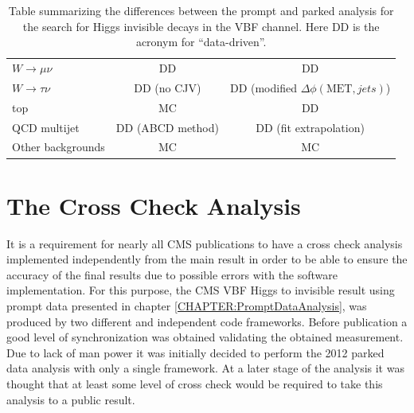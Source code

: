 \begin{table}[!htp]
\begin{tabular}{|l||c|c|}
$W\rightarrow\mu\nu$    & DD               & DD                                          \\
$W\rightarrow\tau\nu$   & DD (no CJV)      & DD (modified $\Delta\phi(\text{MET},jets)$) \\
top                     & MC               & DD                                          \\
QCD multijet            & DD (ABCD method) & DD (fit extrapolation)                      \\ 
Other backgrounds        & MC               & MC                                          \\ 
\hline
\end{tabular}
\caption[Table summarizing the differences between the prompt and parked analysis for the search for Higgs invisible decays in the VBF channel.]
{Table summarizing the differences between the prompt and parked analysis for the search for Higgs invisible decays in the VBF channel. Here DD is the acronym for ``data-driven''.}
\label{TABLE:ParkedDataAnalysis_DifferencesPromptParked}
\end{table}

\section{The Cross Check Analysis}
\label{CHAPTER:ParkedDataAnalysis_CrossCheckAnalysis}


It is a requirement for nearly all \gls{CMS} publications to have a cross check analysis implemented independently from the main result in order to be able to ensure the accuracy of the final results due to possible errors with the software implementation. For this purpose, the \gls{CMS} \gls{VBF} Higgs to invisible result using prompt data presented in chapter \ref{CHAPTER:PromptDataAnalysis}, was produced by two different and independent code frameworks. Before publication a good level of synchronization was obtained validating the obtained measurement. Due to lack of man power it was initially decided to perform the 2012 parked data analysis with only a single framework. At a later stage of the analysis it was thought that at least some level of cross check would be required to take this analysis to a public result.
 
